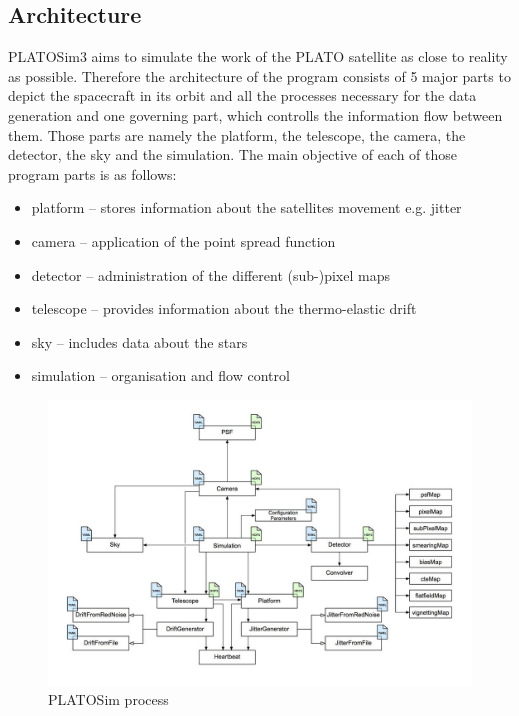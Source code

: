 \subsection{Architecture}
PLATOSim3 aims to simulate the work of the PLATO satellite as close to reality as possible. Therefore the architecture of the program consists of 5 major parts to depict the spacecraft in its orbit and all the processes necessary for the data generation and one governing part, which controlls the information flow between them. Those parts are namely the platform, the telescope, the camera, the detector, the sky and the simulation. The main objective of each of those program parts is as follows:

\begin{itemize}
	\item platform -- stores information about the satellites movement e.g. jitter
	\item camera -- application of the point spread function
	\item detector -- administration of the different (sub-)pixel maps
	\item telescope -- provides information about the thermo-elastic drift
	\item sky -- includes data about the stars
	\item simulation -- organisation and flow control 
\end{itemize} 

\begin{figure}[h]
	\centering
	\includegraphics[width=\textwidth]{PLATOSim_design.jpg}
	\caption{PLATOSim process}
	\label{fig:mesh3}
\end{figure}

